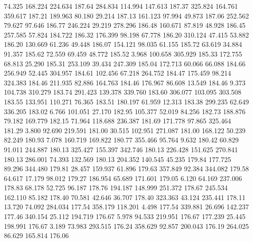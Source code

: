   74.325  168.224  224.634       187.64
 284.834  114.994  147.613       187.37
 325.824  164.761  359.617       187.21
 189.963   80.180   29.214       187.13
 161.123   97.994   49.873       187.06
 252.562   79.627   97.646       186.77
 246.224   29.219  278.296       186.48
 160.671   87.819   48.928       186.45
 257.585   57.824  184.722       186.32
 176.399   98.198   67.778       186.20
 310.124   47.415   53.882       186.20
 130.669   61.236   49.448       186.07
 154.121   98.035   61.155       185.72
  63.619   34.884   91.357       185.62
  72.559   69.459   48.772       185.52
   3.968  100.658  305.929       185.33
 172.755   68.813   25.290       185.31
 253.109   39.434  247.309       185.04
 172.713   60.066   66.088       184.66
 256.949   52.445  304.957       184.61
 102.456   67.218  264.752       184.47
 175.459   98.214  324.383       184.46
 211.935   82.886  164.763       184.46
 176.967   86.608   13.549       184.46
   9.373  104.738  310.279       183.74
 291.423  139.378  339.760       183.60
 306.077  103.095  303.508       183.55
 133.951  110.271   76.365       183.51
 180.197   61.959   12.313       183.38
 299.235   62.649  336.205       183.02
   6.766  101.051   27.170       182.95
 105.377   52.019   84.256       182.73
 188.876   79.182  169.779       182.15
  71.964  118.688  236.387       181.69
 171.778   97.865  325.464       181.29
   3.800   92.690  219.591       181.00
  30.515  102.951  271.087       181.00
 168.122   50.239   82.249       180.93
   7.078  160.719  169.822       180.77
 355.466   95.764    9.632       180.42
  60.829   91.011  244.887       180.13
 325.427  155.397  342.746       180.13
 226.428  151.625  270.841       180.13
 286.001   74.393  132.569       180.13
 204.352  140.545   45.235       179.84
 177.725   89.296  344.480       179.81
  28.457  159.937   61.896       179.63
 357.849   92.384  344.082       179.58
  64.617   17.179   98.012       179.27
 186.954   65.689  171.601       179.05
   6.120   64.169  237.006       178.83
  68.178   52.725   96.187       178.76
 194.187  148.999  251.372       178.67
 245.534  162.110   85.182       178.40
  70.581   42.646   36.707       178.40
 323.363   43.124  235.441       178.11
  13.720   74.092  284.034       177.54
 358.179  118.201    4.498       177.54
 339.881   26.696  142.237       177.46
 340.154   25.112  194.719       176.67
   5.978   94.533  219.951       176.67
 177.239   25.445  198.991       176.67
   3.189   73.983  293.515       176.24
 358.629   92.857  200.043       176.19
 264.025   86.629  165.814       176.06
